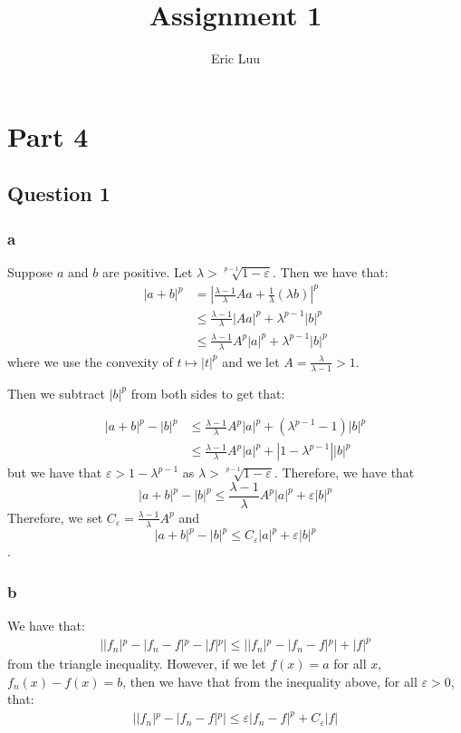 \documentclass{article}
\title{Assignment 1}
\author{Eric Luu}
\theoremstyle{definition}
\numberwithin{theorem}{section}
\numberwithin{equation}{section}
\begin{document}
\maketitle
\section*{Part 4}
\subsection*{Question 1}
\subsubsection*{a}
Suppose $a$ and $b$ are positive. Let $\lambda > \sqrt[p-1]{1- \varepsilon}$. Then we have that:
\begin{align*}
	| a + b |^p &= | \frac{\lambda- 1}{\lambda} A a + \frac{1}{\lambda}(\lambda b) |^p\\
	&\leq \frac{\lambda- 1}{\lambda} |A a |^p + \lambda^{p-1} |b|^p\\
	&\leq \frac{\lambda- 1}{\lambda} A^p |a|^p + \lambda^{p-1} |b|^p
\end{align*}
where we use the convexity of $t \mapsto |t|^p$ and we let
$A = \frac{\lambda}{\lambda - 1} > 1$. 

Then we subtract $|b|^p$ from both sides to get that:

\begin{align*}
	| a + b |^p - |b|^p &\leq \frac{\lambda- 1}{\lambda} A^p |a|^p + (\lambda^{p-1} - 1) |b|^p\\
	&\leq \frac{\lambda- 1}{\lambda} A^p |a|^p + |1 - \lambda^{p-1}| |b|^p
\end{align*}
but we have that $\varepsilon >1 - \lambda^{p-1}$ as $\lambda > \sqrt[p-1]{1- \varepsilon}$. Therefore, we have that 
\begin{equation*}
	| a + b |^p - |b|^p \leq \frac{\lambda- 1}{\lambda} A^p |a|^p + 
	\varepsilon|b|^p
\end{equation*}
Therefore, we set $C_\varepsilon = \frac{\lambda- 1}{\lambda} A^p $ and 
\begin{equation*}
	| a + b |^p - |b|^p \leq C_\varepsilon |a|^p + 
	\varepsilon|b|^p
\end{equation*}.

\subsubsection*{b}
We have that:
\begin{align*}
	| |f_n|^p - |f_n - f|^p - |f|^p | \leq  | |f_n|^p - |f_n - f|^p | + |f|^p 
\end{align*}
from the triangle inequality.
However, if we let $f(x) = a$ for all $x$, $f_n(x) - f(x) = b$, then we have that from the inequality above, for all $\varepsilon > 0$, that:
\begin{align*}
	 | |f_n|^p - |f_n - f|^p| \leq \varepsilon |f_n - f|^p + C_\varepsilon |f|
\end{align*}
\end{document}
